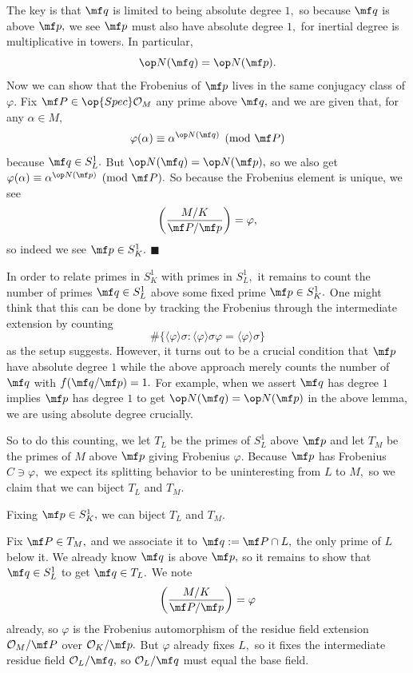 The key is that $\mf q$ is limited to being absolute degree $1,$ so because $\mf q$ is above $\mf p,$ we see $\mf p$ must also have absolute degree $1,$ for inertial degree is multiplicative in towers. In particular,
\[\op N(\mf q)=\op N(\mf p).\]
Now we can show that the Frobenius of $\mf p$ lives in the same conjugacy class of $\varphi.$ Fix $\mf P\in\op{Spec}\mathcal O_M$ any prime above $\mf q,$ and we are given that, for any $\alpha\in M,$
\[\varphi(\alpha)\equiv\alpha^{\op N(\mf q)}\pmod{\mf P}\]
because $\mf q\in S^1_L.$ But $\op N(\mf q)=\op N(\mf p),$ so we also get $\varphi(\alpha)\equiv\alpha^{\op N(\mf p)}\pmod{\mf P}.$ So because the Frobenius element is unique, we see
\[\left(\frac{M/K}{\mf P/\mf p}\right)=\varphi,\]
so indeed we see $\mf p\in S^1_K.$ $\blacksquare$

In order to relate primes in $S^1_K$ with primes in $S^1_L,$ it remains to count the number of primes $\mf q\in S^1_L$ above some fixed prime $\mf p\in S^1_K.$ One might think that this can be done by tracking the Frobenius through the intermediate extension by counting
\[\#\{\langle\varphi\rangle\sigma:\langle\varphi\rangle\sigma\varphi=\langle\varphi\rangle\sigma\}\]
as the setup suggests. However, it turns out to be a crucial condition that $\mf p$ have absolute degree $1$ while the above approach merely counts the number of $\mf q$ with $f(\mf q/\mf p)=1.$ For example, when we assert $\mf q$ has degree $1$ implies $\mf p$ has degree $1$ to get $\op N(\mf q)=\op N(\mf p)$ in the above lemma, we are using absolute degree crucially.

So to do this counting, we let $T_L$ be the primes of $S^1_L$ above $\mf p$ and let $T_M$ be the primes of $M$ above $\mf p$ giving Frobenius $\varphi.$ Because $\mf p$ has Frobenius $C\ni\varphi,$ we expect its splitting behavior to be uninteresting from $L$ to $M,$ so we claim that we can biject $T_L$ and $T_M.$
\begin{lemma}
    Fixing $\mf p\in S^1_K,$ we can biject $T_L$ and $T_M.$
\end{lemma}
Fix $\mf P\in T_M,$ and we associate it to $\mf q:=\mf P\cap L,$ the only prime of $L$ below it. We already know $\mf q$ is above $\mf p,$ so it remains to show that $\mf q\in S^1_L$ to get $\mf q\in T_L.$ We note
\[\left(\frac{M/K}{\mf P/\mf p}\right)=\varphi\]
already, so $\varphi$ is the Frobenius automorphism of the residue field extension $\mathcal O_M/\mf P$ over $\mathcal O_K/\mf p.$ But $\varphi$ already fixes $L,$ so it fixes the intermediate residue field $\mathcal O_L/\mf q,$ so $\mathcal O_L/\mf q$ must equal the base field.

